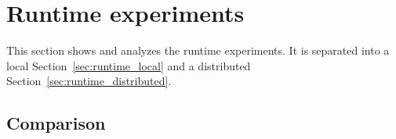 \section{Runtime experiments}
\label{sec:runtime}

This section shows and analyzes the runtime experiments.
It is separated into a local Section~\ref{sec:runtime_local} and a distributed Section~\ref{sec:runtime_distributed}.






\subsection{Comparison}
\label{sec:runtime_comparison}
